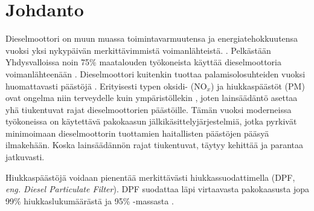\chapter{Johdanto}%
\label{ch:johdanto}
Dieselmoottori on muun muassa toimintavarmuutensa ja energiatehokkuutensa vuoksi yksi nykypäivän merkittävimmistä voimanlähteistä.  
\cite[s. 121, 137-138]{Koten_2024}.
Pelkästään Yhdysvalloissa noin 75\% maatalouden työkoneista käyttää dieselmoottoria voimanlähteenään \cite[s. 122]{Koten_2024}.  
Dieselmoottori kuitenkin tuottaa palamisolosuhteiden vuoksi
huomattavasti päästöjä \cite{FiebigMichael2014Pefd}. Erityisesti typen oksidi- (NO\(_x\)) ja hiukkaspäästöt (PM) ovat ongelma niin terveydelle kuin ympäristöllekin \cite{FiebigMichael2014Pefd}\cite[s. 138]{Koten_2024}, joten  lainsäädäntö asettaa yhä tiukentuvat rajat dieselmoottorien päästöille. Tämän vuoksi moderneissa työkoneissa on käytettävä pakokaasun jälkikäsittelyjärjestelmiä, jotka pyrkivät minimoimaan dieselmoottorin tuottamien haitallisten päästöjen pääsyä ilmakehään. Koska lainsäädännön rajat tiukentuvat, täytyy kehittää ja parantaa jatkuvasti.

Hiukkaspäästöjä voidaan pienentää merkittävästi hiukkassuodattimella (DPF, \emph{eng. Diesel Particulate Filter}). DPF suodattaa läpi virtaavasta pakokaasusta jopa 99\% hiukkaslukumäärästä ja 95\% -massasta \cite{Yan_state_of_the_art}.
